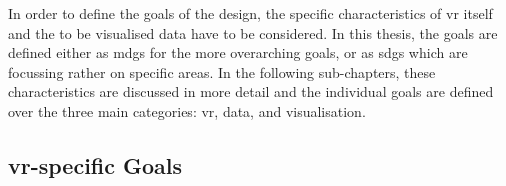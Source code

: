 In order to define the goals of the design, the specific characteristics of \gls{vr} itself and the to be visualised data have to be considered. In this thesis, the goals are defined either as \glspl{mdg} for the more overarching goals, or as \glspl{sdg} which are focussing rather on specific areas. In the following sub-chapters, these characteristics are discussed in more detail and the individual goals are defined over the three main categories: \gls{vr}, data, and visualisation.

\subsection{\gls{vr}-specific Goals}

